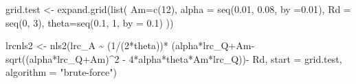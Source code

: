 \documentclass[
]{krantz}
\makeatletter
\newenvironment{Shaded}{\begin{snugshade}}{\end{snugshade}}
\newcommand{\AttributeTok}[1]{\textcolor[rgb]{0.77,0.63,0.00}{#1}}
\newcommand{\DecValTok}[1]{\textcolor[rgb]{0.00,0.00,0.81}{#1}}
\newcommand{\FloatTok}[1]{\textcolor[rgb]{0.00,0.00,0.81}{#1}}
\newcommand{\FunctionTok}[1]{\textcolor[rgb]{0.00,0.00,0.00}{#1}}
\newcommand{\NormalTok}[1]{#1}
\newcommand{\OtherTok}[1]{\textcolor[rgb]{0.56,0.35,0.01}{#1}}
\newcommand{\SpecialCharTok}[1]{\textcolor[rgb]{0.00,0.00,0.00}{#1}}
\newcommand{\StringTok}[1]{\textcolor[rgb]{0.31,0.60,0.02}{#1}}
\newenvironment{kframe}{%
\medskip{}
\setlength{\fboxsep}{.8em}
 \def\at@end@of@kframe{}%
 \ifinner\ifhmode%
  \def\at@end@of@kframe{\end{minipage}}%
  \begin{minipage}{\columnwidth}%
 \fi\fi%
 \def\FrameCommand##1{\hskip\@totalleftmargin \hskip-\fboxsep
 \colorbox{shadecolor}{##1}\hskip-\fboxsep
     \hskip-\linewidth \hskip-\@totalleftmargin \hskip\columnwidth}%
 \MakeFramed {\advance\hsize-\width
   \@totalleftmargin\z@ \linewidth\hsize
   \@setminipage}}%
 {\par\unskip\endMakeFramed%
 \at@end@of@kframe}
\renewenvironment{Shaded}{\begin{kframe}}{\end{kframe}}
\makeatother
\begin{document}
\begin{Shaded}
\begin{Highlighting}[]
\NormalTok{grid.test }\OtherTok{\textless{}{-}} \FunctionTok{expand.grid}\NormalTok{(}\FunctionTok{list}\NormalTok{(}
  \AttributeTok{Am=}\FunctionTok{c}\NormalTok{(}\DecValTok{12}\NormalTok{),}
  \AttributeTok{alpha =} \FunctionTok{seq}\NormalTok{(}\FloatTok{0.01}\NormalTok{, }\FloatTok{0.08}\NormalTok{, }\AttributeTok{by =}\FloatTok{0.01}\NormalTok{),}
  \AttributeTok{Rd =} \FunctionTok{seq}\NormalTok{(}\DecValTok{0}\NormalTok{, }\DecValTok{3}\NormalTok{),}
  \AttributeTok{theta=}\FunctionTok{seq}\NormalTok{(}\FloatTok{0.1}\NormalTok{, }\DecValTok{1}\NormalTok{, }\AttributeTok{by =} \FloatTok{0.1}\NormalTok{)}
\NormalTok{  ))}

\NormalTok{lrcnls2 }\OtherTok{\textless{}{-}} \FunctionTok{nls2}\NormalTok{(lrc\_A }\SpecialCharTok{\textasciitilde{}} 
\NormalTok{        (}\DecValTok{1}\SpecialCharTok{/}\NormalTok{(}\DecValTok{2}\SpecialCharTok{*}\NormalTok{theta))}\SpecialCharTok{*}
\NormalTok{        (alpha}\SpecialCharTok{*}\NormalTok{lrc\_Q}\SpecialCharTok{+}\NormalTok{Am}\SpecialCharTok{{-}}\FunctionTok{sqrt}\NormalTok{((alpha}\SpecialCharTok{*}\NormalTok{lrc\_Q}\SpecialCharTok{+}\NormalTok{Am)}\SpecialCharTok{\^{}}\DecValTok{2} \SpecialCharTok{{-}} 
                               \DecValTok{4}\SpecialCharTok{*}\NormalTok{alpha}\SpecialCharTok{*}\NormalTok{theta}\SpecialCharTok{*}\NormalTok{Am}\SpecialCharTok{*}\NormalTok{lrc\_Q))}\SpecialCharTok{{-}} 
\NormalTok{        Rd, }\AttributeTok{start =}\NormalTok{ grid.test, }\AttributeTok{algorithm =} \StringTok{"brute{-}force"}\NormalTok{)}
\end{Highlighting}
\end{Shaded}
\end{document}
